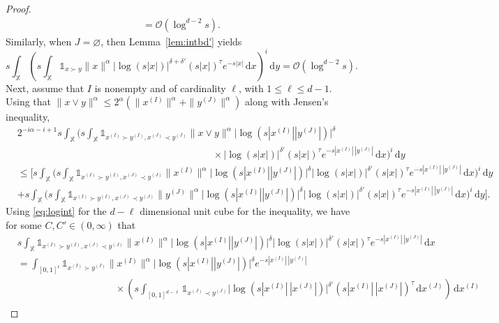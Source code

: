 \documentclass[11pt,reqno]{amsart}
\numberwithin{equation}{section}
\theoremstyle{definition}
\renewcommand{\emptyset}{\varnothing}
\newcommand{\XX}{\mathbb{X}}
\newcommand{\diff}{{\,\mathrm d}}
\begin{document}
\begin{proof}
\begin{align*}
	=\mathcal{O}(\log^{d-2} s).
	\end{align*}
	Similarly, when $J=\emptyset$, then Lemma~\ref{lem:intbd'} yields
	\begin{displaymath}
	s\int_{\XX}  \left(s \int_\XX
	\mathds{1}_{x \succ y} \|x\|^\alpha \big| \log (s|x|)\big|^{\delta+ \delta'} (s|x|)^\tau e^{-s |x|} \diff x\right)^i \diff y 
	=\mathcal{O}(\log^{d-2} s).
	\end{displaymath}
	Next, assume that $I$ is nonempty and of cardinality $\ell$, with
	$1 \le \ell \le d-1$.
	Using that $\|x \vee y\|^\alpha \le 2^\alpha (\|x^{(I)}\|^\alpha + \|y^{(J)}\|^\alpha)$ along with Jensen's inequality,
	\begin{align}\label{eq:spl}
	& 2^{-i \alpha - i+1} s\int_{\XX}  \Bigg(s \int_\XX \mathds{1}_{x^{(I)} \succ y^{(I)}, x^{(J)} \prec y^{(J)}} \|x \vee y\|^\alpha
	 \big| \log (s|x^{(I)}| |y^{(J)}|)\big|^\delta \nonumber\\
	 & \qquad \qquad \qquad \qquad\qquad \qquad \qquad \qquad\qquad \qquad\times \big| \log (s|x|)\big|^{\delta'} (s|x|)^\tau e^{-s |x^{(I)}|\,|y^{(J)}|} \diff x\Bigg)^i \diff y \nonumber\\
	&\le \Bigg[ s\int_{\XX}  \Bigg(s \int_\XX \mathds{1}_{x^{(I)} \succ y^{(I)}, x^{(J)} \prec y^{(J)}} \|x^{(I)}\|^\alpha
	 \big| \log (s|x^{(I)}| |y^{(J)}|)\big|^\delta \big| \log (s|x|)\big|^{\delta'} (s|x|)^\tau e^{-s |x^{(I)}|\,|y^{(J)}|} \diff x\Bigg)^i \diff y\nonumber\\
	&+ s\int_{\XX} \Bigg(s \int_\XX \mathds{1}_{x^{(I)} \succ y^{(I)}, x^{(J)} \prec y^{(J)}} \|y^{(J)}\|^\alpha
	 \big| \log (s|x^{(I)}| |y^{(J)}|)\big|^\delta \big| \log (s|x|)\big|^{\delta'} (s|x|)^\tau e^{-s |x^{(I)}|\,|y^{(J)}|} \diff x\Bigg)^i \diff y\Bigg].
	\end{align}
	Using \eqref{eq:logint} for the $d-\ell$ dimensional unit cube for the inequality, we have for some $C,C' \in (0,\infty)$ that
	\begin{align*}
	&s \int_\XX \mathds{1}_{x^{(I)} \succ y^{(I)}, x^{(J)} \prec y^{(J)}} \|x^{(I)}\|^\alpha
	\big| \log (s|x^{(I)}| |y^{(J)}|)\big|^\delta \big| \log (s|x|)\big|^{\delta'}(s|x|)^\tau e^{-s |x^{(I)}|\,|y^{(J)}|}  \diff x\\
	&= \int_{[0,1]^\ell}  \mathds{1}_{x^{(I)} \succ y^{(I)}}  \|x^{(I)}\|^\alpha \big| \log (s|x^{(I)}| |y^{(J)}|)\big|^\delta  e^{-s |x^{(I)}|\,|y^{(J)}|} \\
	& \qquad \qquad \qquad \qquad \qquad \times \left(s\int_{[0,1]^{d-\ell}} \mathds{1}_{x^{(J)} \prec y^{(J)}}  \big| \log (s|x^{(I)}|\,|x^{(J)}|)\big|^{\delta'} (s|x^{(I)}|\,|x^{(J)}|)^\tau \diff x^{(J)}\right) \diff x^{(I)}\\

\end{align*}
\end{proof}
\end{document}
